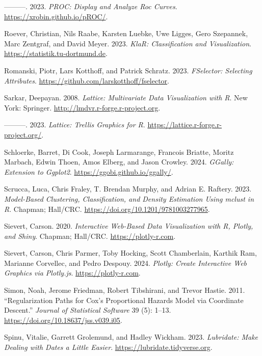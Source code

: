 \documentclass[
  notitlepage]{book}
\newlength{\cslhangindent}
\newenvironment{cslreferences}%
  {\setlength{\parindent}{0pt}%
  \everypar{\setlength{\hangindent}{\cslhangindent}}\ignorespaces}%
  {\par}
\begin{document}
\begin{cslreferences}
\leavevmode\hypertarget{ref-R-pROC}{}%
---------. 2023. \emph{PROC: Display and Analyze Roc Curves}. \url{https://xrobin.github.io/pROC/}.

\leavevmode\hypertarget{ref-R-klaR}{}%
Roever, Christian, Nils Raabe, Karsten Luebke, Uwe Ligges, Gero Szepannek, Marc Zentgraf, and David Meyer. 2023. \emph{KlaR: Classification and Visualization}. \url{https://statistik.tu-dortmund.de}.

\leavevmode\hypertarget{ref-R-FSelector}{}%
Romanski, Piotr, Lars Kotthoff, and Patrick Schratz. 2023. \emph{FSelector: Selecting Attributes}. \url{https://github.com/larskotthoff/fselector}.

\leavevmode\hypertarget{ref-lattice2008}{}%
Sarkar, Deepayan. 2008. \emph{Lattice: Multivariate Data Visualization with R}. New York: Springer. \url{http://lmdvr.r-forge.r-project.org}.

\leavevmode\hypertarget{ref-R-lattice}{}%
---------. 2023. \emph{Lattice: Trellis Graphics for R}. \url{https://lattice.r-forge.r-project.org/}.

\leavevmode\hypertarget{ref-R-GGally}{}%
Schloerke, Barret, Di Cook, Joseph Larmarange, Francois Briatte, Moritz Marbach, Edwin Thoen, Amos Elberg, and Jason Crowley. 2024. \emph{GGally: Extension to Ggplot2}. \url{https://ggobi.github.io/ggally/}.

\leavevmode\hypertarget{ref-mclust2023}{}%
Scrucca, Luca, Chris Fraley, T. Brendan Murphy, and Adrian E. Raftery. 2023. \emph{Model-Based Clustering, Classification, and Density Estimation Using mclust in R}. Chapman; Hall/CRC. \url{https://doi.org/10.1201/9781003277965}.

\leavevmode\hypertarget{ref-plotly2020}{}%
Sievert, Carson. 2020. \emph{Interactive Web-Based Data Visualization with R, Plotly, and Shiny}. Chapman; Hall/CRC. \url{https://plotly-r.com}.

\leavevmode\hypertarget{ref-R-plotly}{}%
Sievert, Carson, Chris Parmer, Toby Hocking, Scott Chamberlain, Karthik Ram, Marianne Corvellec, and Pedro Despouy. 2024. \emph{Plotly: Create Interactive Web Graphics via Plotly.js}. \url{https://plotly-r.com}.

\leavevmode\hypertarget{ref-glmnet2011}{}%
Simon, Noah, Jerome Friedman, Robert Tibshirani, and Trevor Hastie. 2011. ``Regularization Paths for Cox's Proportional Hazards Model via Coordinate Descent.'' \emph{Journal of Statistical Software} 39 (5): 1--13. \url{https://doi.org/10.18637/jss.v039.i05}.

\leavevmode\hypertarget{ref-R-lubridate}{}%
Spinu, Vitalie, Garrett Grolemund, and Hadley Wickham. 2023. \emph{Lubridate: Make Dealing with Dates a Little Easier}. \url{https://lubridate.tidyverse.org}.


\end{cslreferences}
\end{document}
